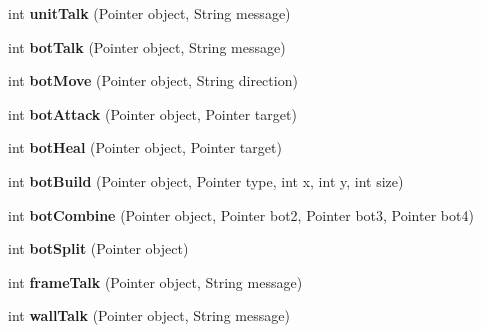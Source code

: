 \begin{DoxyCompactItemize}
\item 
\hypertarget{interfaceClient_ae85be7504ef37da585be29e41cd86009}{
int {\bfseries unitTalk} (Pointer object, String message)}
\label{interfaceClient_ae85be7504ef37da585be29e41cd86009}

\item 
\hypertarget{interfaceClient_ab670d2ce8625e30392b054dabbeadf38}{
int {\bfseries botTalk} (Pointer object, String message)}
\label{interfaceClient_ab670d2ce8625e30392b054dabbeadf38}

\item 
\hypertarget{interfaceClient_a69c79c5cdeaff86718853db6c1e5409e}{
int {\bfseries botMove} (Pointer object, String direction)}
\label{interfaceClient_a69c79c5cdeaff86718853db6c1e5409e}

\item 
\hypertarget{interfaceClient_a2ab4c040a58d92c2ed58305a4deb9da8}{
int {\bfseries botAttack} (Pointer object, Pointer target)}
\label{interfaceClient_a2ab4c040a58d92c2ed58305a4deb9da8}

\item 
\hypertarget{interfaceClient_a9e0b35bda022503bc34b3eb40b23918b}{
int {\bfseries botHeal} (Pointer object, Pointer target)}
\label{interfaceClient_a9e0b35bda022503bc34b3eb40b23918b}

\item 
\hypertarget{interfaceClient_a4ec4c06e54844cbb6cb1a57ee5f10d26}{
int {\bfseries botBuild} (Pointer object, Pointer type, int x, int y, int size)}
\label{interfaceClient_a4ec4c06e54844cbb6cb1a57ee5f10d26}

\item 
\hypertarget{interfaceClient_aee1f13aeee6aada4c97e4cd0a913b67c}{
int {\bfseries botCombine} (Pointer object, Pointer bot2, Pointer bot3, Pointer bot4)}
\label{interfaceClient_aee1f13aeee6aada4c97e4cd0a913b67c}

\item 
\hypertarget{interfaceClient_ad70e5279bf0f55fdab08073d252dbd30}{
int {\bfseries botSplit} (Pointer object)}
\label{interfaceClient_ad70e5279bf0f55fdab08073d252dbd30}

\item 
\hypertarget{interfaceClient_a114c70ed3c06a2d6f487d010334bfee5}{
int {\bfseries frameTalk} (Pointer object, String message)}
\label{interfaceClient_a114c70ed3c06a2d6f487d010334bfee5}

\item 
\hypertarget{interfaceClient_a684ee609a689e1fb5b9e0404d56faeb6}{
int {\bfseries wallTalk} (Pointer object, String message)}
\label{interfaceClient_a684ee609a689e1fb5b9e0404d56faeb6}


\end{DoxyCompactItemize}
